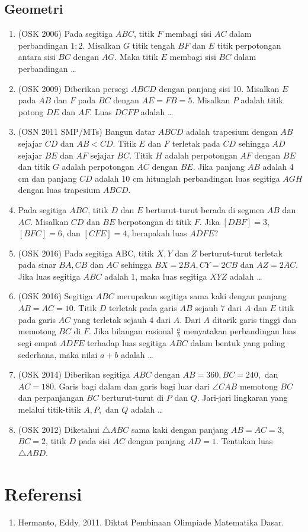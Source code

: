 \documentclass[11pt]{scrartcl}
\begin{document}
\subsection{Geometri}
\begin{enumerate}
    \item (OSK 2006) Pada segitiga $ABC$, titik $F$ membagi sisi $AC$ dalam perbandingan $1 : 2$. 
Misalkan $G$ titik tengah $BF$ dan $E$ titik perpotongan antara sisi $BC$ dengan $AG$. Maka titik $E$ membagi sisi $BC$
dalam perbandingan \dots

\item (OSK 2009) Diberikan persegi $ABCD$ dengan panjang sisi 10. Misalkan $E$ pada $AB$ dan $F$
pada $BC$ dengan $AE = FB = 5$. Misalkan $P$ adalah titik potong $DE$ dan $AF$. Luas $DCFP$ adalah \dots

\item (OSN 2011 SMP/MTs) Bangun datar $ABCD$ adalah
trapesium dengan $AB$ sejajar $CD$ dan $AB < CD$. Titik $E$ dan $F$ terletak
pada $CD$ sehingga $AD$ sejajar $BE$ dan $AF$ sejajar $BC$. Titik $H$ 
adalah perpotongan $AF$ dengan $BE$ dan titik $G$ adalah 
perpotongan $AC$ dengan $BE$. Jika panjang $AB$ adalah 4 cm
dan panjang $CD$ adalah 10 cm hitunglah perbandingan luas 
segitiga $AGH$ dengan luas trapesium $ABCD$. 

\item Pada segitiga $ABC$, titik $D$ dan $E$ berturut-turut berada di segmen $AB$ dan $AC$. Misalkan $CD$ dan $BE$ berpotongan di titik $F$. Jika $[DBF]=3$, $[BFC]=6$, dan $[CFE]=4$, berapakah luas $ADFE$?

\item (OSK 2016) Pada segitiga ABC, titik $X, Y$ dan $Z$ berturut-turut terletak pada sinar $BA, CB$ dan $AC$
	sehingga $BX = 2BA, CY = 2CB$ dan $AZ = 2AC$. Jika luas segitiga $ABC$ adalah 1, maka luas
	segitiga $XYZ$ adalah \dots
	
\item (OSK 2016) Segitiga $ABC$ merupakan segitiga sama kaki dengan panjang $AB = AC = 10 $.
	Titik $D$ terletak pada garis $AB$ sejauh $7 $ dari $A$ dan $E$ titik pada garis $AC$ yang
	terletak sejauh $4 $ dari $A$. Dari $A$ ditarik garis tinggi dan memotong $BC$ di $F$.
	Jika bilangan rasional $\frac{a}{b}$ menyatakan perbandingan luas segi empat $ADFE$ terhadap
	luas segitiga $ABC$ dalam bentuk yang paling sederhana, maka nilai $a + b$ adalah \dots
	
	\item (OSK 2014) Diberikan segitiga $ABC$ dengan $AB = 360, BC = 240,$ dan $AC = 180$. Garis
	bagi dalam dan garis bagi luar dari $\angle CAB$ memotong $BC$ dan perpanjangan $BC$
	berturut-turut di $P$ dan $Q$. Jari-jari lingkaran yang melalui titik-titik $A, P,$ dan $Q$
	adalah \dots
	
	\item (OSK 2012) Diketahui $\triangle ABC$ sama kaki dengan panjang $AB = AC = 3$, $BC = 2$, titik $D$ pada sisi $AC$ dengan panjang $AD = 1$. Tentukan luas $\triangle ABD$.
\end{enumerate}

\section{Referensi}
\begin{enumerate}
    \item Hermanto, Eddy. 2011. Diktat Pembinaan Olimpiade Matematika Dasar.
\end{enumerate}
\end{document}

